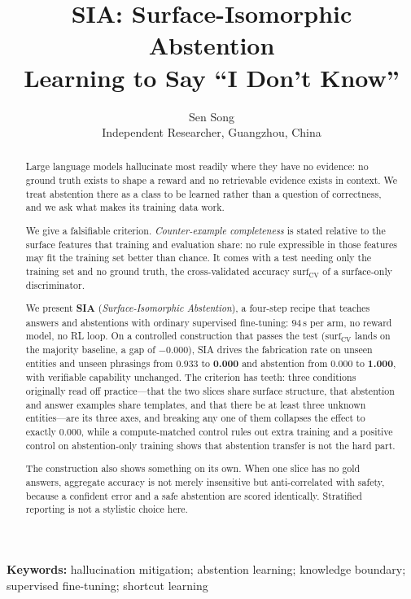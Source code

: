 \documentclass[11pt,a4paper]{article}
\title{\bfseries SIA: Surface-Isomorphic Abstention\\[6pt]
\large Learning to Say ``I Don't Know''}
\author{Sen Song\\ \small Independent Researcher, Guangzhou, China}
\date{}
\newcommand{\surfcv}{$\mathrm{surf}_\mathrm{CV}$}
\begin{document}
\maketitle

\begin{abstract}
\noindent
Large language models hallucinate most readily where they have no evidence: no
ground truth exists to shape a reward and no retrievable evidence exists in
context. We treat abstention there as a class to be learned rather than a
question of correctness, and we ask what makes its training data work.

We give a falsifiable criterion. \emph{Counter-example completeness} is stated
relative to the surface features that training and evaluation share: no rule
expressible in those features may fit the training set better than chance. It
comes with a test needing only the training set and no ground truth, the
cross-validated accuracy \surfcv{} of a surface-only discriminator.

We present \textbf{SIA} (\emph{Surface-Isomorphic Abstention}), a four-step
recipe that teaches answers and abstentions with ordinary supervised
fine-tuning: $94$\,s per arm, no reward model, no RL loop. On a controlled
construction that passes the test (\surfcv{} lands on the majority baseline, a
gap of $-0.000$), SIA drives the fabrication rate on unseen entities and unseen
phrasings from $0.933$ to \textbf{0.000} and abstention from $0.000$ to
\textbf{1.000}, with verifiable capability unchanged. The criterion has teeth:
three conditions originally read off practice---that the two slices share
surface structure, that abstention and answer examples share templates, and
that there be at least three unknown entities---are its three axes, and
breaking any one of them collapses the effect to exactly $0.000$, while a
compute-matched control rules out extra training and a positive control on
abstention-only training shows that abstention transfer is not the hard part.

The construction also shows something on its own. When one slice has no gold
answers, aggregate accuracy is not merely insensitive but anti-correlated with
safety, because a confident error and a safe abstention are scored identically.
Stratified reporting is not a stylistic choice here.
\end{abstract}

\noindent\textbf{Keywords:} hallucination mitigation; abstention learning;
knowledge boundary; supervised fine-tuning; shortcut learning
\end{document}
